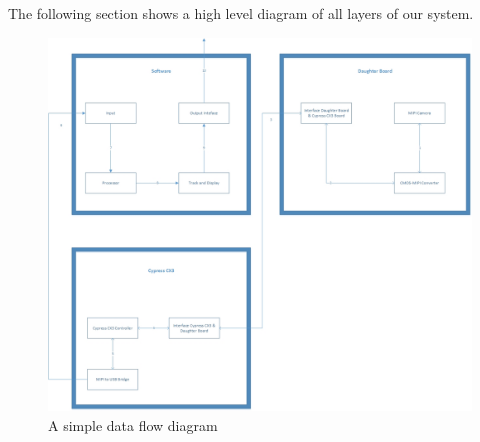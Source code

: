 The following section shows a high level diagram of all layers of our system.
\begin{figure}[h!]
	\centering
 	\includegraphics[width=\textwidth]{images/Diagram_WHOLE.jpg}
 \caption{A simple data flow diagram}
\end{figure}
